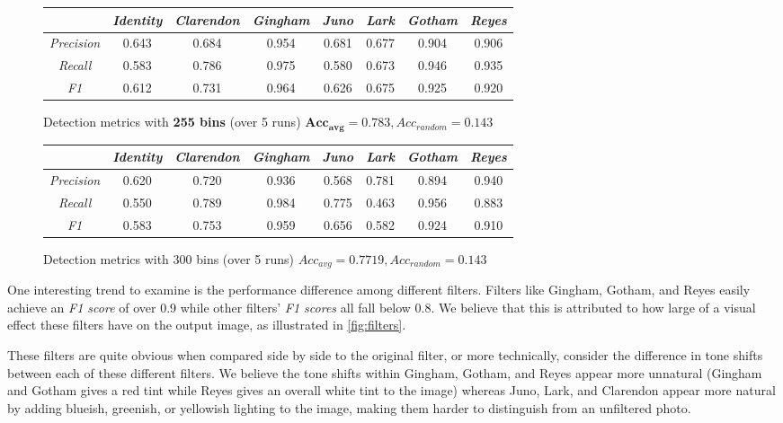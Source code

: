 \documentclass[11pt]{article}
\begin{document}
\begin{figure}[H]
    \centering
    \begin{tabular}{|c|c|c|c|c|c|c|c|}
        \hline    & \textit{Identity} & \textit{Clarendon} & \textit{Gingham} & \textit{Juno} & \textit{Lark} & \textit{Gotham} & \textit{Reyes}\\
        \hline \textit{Precision} & 0.643 & 0.684 & 0.954 & 0.681 & 0.677 & 0.904 & 0.906\\
        \hline \textit{Recall}    & 0.583 & 0.786 & 0.975 & 0.580 & 0.673 & 0.946 & 0.935 \\
        \hline \textit{F1}        & 0.612 & 0.731 & 0.964 & 0.626 & 0.675 & 0.925 & 0.920\\
        \hline
    \end{tabular}
    \caption{Detection metrics with \textbf{255 bins} (over 5 runs) $\mathbf{Acc_{avg} = 0.783}, Acc_{random} = 0.143$}
    \label{fig:filter_metrics}
\end{figure}

\begin{figure}[H]
    \centering
    \begin{tabular}{|c|c|c|c|c|c|c|c|}
        \hline    & \textit{Identity} & \textit{Clarendon} & \textit{Gingham} & \textit{Juno} & \textit{Lark} & \textit{Gotham} & \textit{Reyes}\\
        \hline \textit{Precision} & 0.620 & 0.720 & 0.936 & 0.568 & 0.781 & 0.894 & 0.940\\
        \hline \textit{Recall}    & 0.550 & 0.789 & 0.984 & 0.775 & 0.463 & 0.956 & 0.883 \\
        \hline \textit{F1}        & 0.583 & 0.753 & 0.959 & 0.656 & 0.582 & 0.924 & 0.910\\
        \hline
    \end{tabular}
    \caption{Detection metrics with 300 bins (over 5 runs) $Acc_{avg} = 0.7719, Acc_{random} = 0.143$}
    \label{fig:filter_metrics}
\end{figure}

One interesting trend to examine is the performance difference among different filters. Filters like Gingham, Gotham, and Reyes easily achieve an \textit{F1 score} of over 0.9 while other filters’ \textit{F1 scores} all fall below 0.8. We believe that this is attributed to how large of a visual effect these filters have on the output image, as illustrated in \cref{fig:filters}.

These filters are quite obvious when compared side by side to the original filter, or more technically, consider the difference in tone shifts between each of these different filters. We believe the tone shifts within Gingham, Gotham, and Reyes appear more unnatural (Gingham and Gotham gives a red tint while Reyes gives an overall white tint to the image) whereas Juno, Lark, and Clarendon appear more natural by adding blueish, greenish, or yellowish lighting to the image, making them harder to distinguish from an unfiltered photo.
\end{document}

